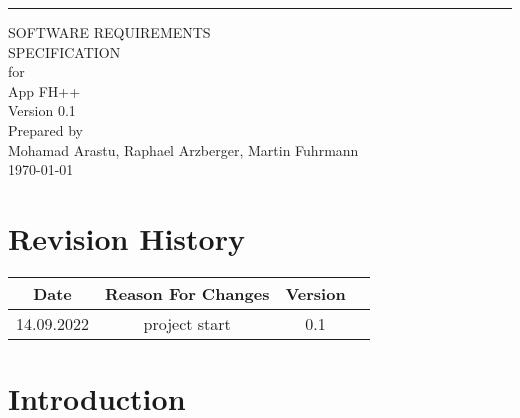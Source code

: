 \documentclass{scrreprt}
\date{}
\def\myversion{0.1 }
\begin{document}
\begin{flushright}
    \rule{16cm}{5pt}\vskip1cm
    \begin{bfseries}
        \Huge{SOFTWARE REQUIREMENTS\\ SPECIFICATION}\\
        \vspace{1.9cm}
        for\\
        \vspace{1.9cm}
        App FH++\\
        \vspace{1.9cm}
        \LARGE{Version \myversion}\\
        \vspace{1.9cm}
        Prepared by \\ {\small Mohamad Arastu, Raphael Arzberger, Martin Fuhrmann}
        \vspace{1.9cm} \\
        \today\\
    \end{bfseries}
\end{flushright}

\tableofcontents


\chapter*{Revision History}

\begin{center}
    \begin{tabular}{|c|c|c|c|}
        \hline
	    Date & Reason For Changes & Version\\
        \hline
	    14.09.2022 & project start & 0.1\\
        \hline
    \end{tabular}
\end{center}

\chapter{Introduction}
\end{document}
